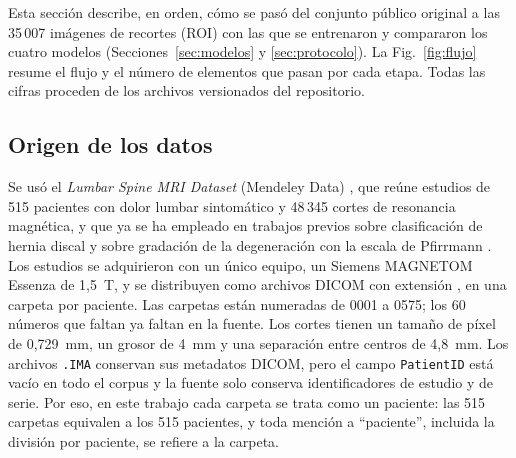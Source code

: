\providecommand{\pendiente}[1]{\textcolor{red}{\textbf{[PENDIENTE: #1]}}}
\providecommand{\arch}[1]{\path{#1}}

Esta sección describe, en orden, cómo se pasó del conjunto público original a las 35\,007 imágenes de recortes (ROI) con las que se entrenaron y compararon los cuatro modelos (Secciones~\ref{sec:modelos} y \ref{sec:protocolo}). La Fig.~\ref{fig:flujo} resume el flujo y el número de elementos que pasan por cada etapa. Todas las cifras proceden de los archivos versionados del repositorio.


\subsection{Origen de los datos}
\label{sec:origen}
Se usó el \emph{Lumbar Spine MRI Dataset} (Mendeley Data) \cite{sudirman2019}, que reúne estudios de 515 pacientes con dolor lumbar sintomático y 48\,345 cortes de resonancia magnética, y que ya se ha empleado en trabajos previos sobre clasificación de hernia discal \cite{sari2025} y sobre gradación de la degeneración con la escala de Pfirrmann \cite{natalia2024}. Los estudios se adquirieron con un único equipo, un Siemens MAGNETOM Essenza de 1,5~T, y se distribuyen como archivos DICOM con extensión \arch{.IMA}, en una carpeta por paciente. Las carpetas están numeradas de 0001 a 0575; los 60 números que faltan ya faltan en la fuente. Los cortes tienen un tamaño de píxel de 0,729~mm, un grosor de 4~mm y una separación entre centros de 4,8~mm. Los archivos \texttt{.IMA} conservan sus metadatos DICOM, pero el campo \texttt{PatientID} está vacío en todo el corpus y la fuente solo conserva identificadores de estudio y de serie. Por eso, en este trabajo cada carpeta se trata como un paciente: las 515 carpetas equivalen a los 515 pacientes, y toda mención a ``paciente'', incluida la división por paciente, se refiere a la carpeta.

